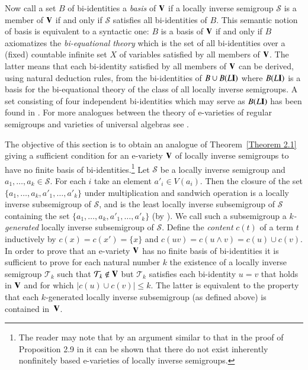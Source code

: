 \documentclass[preprint,1p,times]{elsarticle}
\numberwithin{equation}{section}
\theoremstyle{remark}
\def\pv#1{{\bf #1}}
\def\we{\wedge}
\begin{document}
Now call a set $B$ of bi-identities a \emph{basis} of $\pv V$ if
 a locally inverse semigroup $\mathcal S$ is a member
of $\pv V$ if and only if $\mathcal S$ satisfies all bi-identities of $B$. This semantic notion of basis is equivalent
to a syntactic one: $B$ is a basis of  $\pv V$ if and only if $B$ axiomatizes the \emph{bi-equational theory} which is
the set of all bi-identities over a (fixed) countable infinite set $X$ of variables satisfied by all members of $\pv
V$. The latter means that  each bi-identity satisfied by all members of $\pv V$ can be derived, using natural deduction
rules, from the bi-identities of $B\cup B(L\pv I)$ where $B(L\pv I)$ is a basis for the bi-equational theory of the
class of all locally inverse semigroups. A set consisting of four independent bi-identities which may serve as $B(L\pv
I)$ has been found in \cite{A3}. For more analogues between the theory of e-varieties of regular semigroups and
varieties of universal algebras see \cite{A2,A3,KS,Y1}.

The objective of this section is to obtain an analogue of Theorem~\ref{Theorem 2.1} giving a sufficient condition for
an e-variety $\pv V$ of locally inverse semigroups to have no finite basis of bi-identities.\footnote{The reader may
note that by an argument similar to that in the proof of Proposition 2.9 in \cite{adv} it can be shown that there do
not exist inherently nonfinitely based e-varieties of locally inverse semigroups.} Let $\mathcal S$ be a locally
inverse semigroup and $a_1,\dots,a_k\in \mathcal S$. For each $i$ take an element $a'_i\in V(a_i)$. Then the closure of
the set $\{a_1,\dots,a_k,a'_1,\dots,a'_k\}$ under multiplication and sandwich operation  is a locally inverse
subsemigroup of $\mathcal S$, and is the least locally inverse subsemigroup of $\mathcal S$ containing the set
$\{a_1,\dots,a_k,a'_1,\dots,a'_k\}$ (by \cite{Y1}). We call such a subsemigroup a {\it $k$-generated} locally inverse
subsemigroup of $\mathcal S$. Define the {\it content} $c(t)$ of a term $t$ inductively by $c(x)=c(x')=\{x\}$ and
$c(uv)=c(u\we v)=c(u)\cup c(v)$. In order to prove that an e-variety $\pv V$ has no  finite basis of bi-identities it
is sufficient to prove for each natural number $k$ the existence of a locally inverse semigroup $\mathcal{T}_k$ such
that $\mathcal{T}_k\not\in \pv V$ but $\mathcal{T}_k$ satisfies each bi-identity $u=v$ that holds in $\pv V$ and for
which $\vert c(u)\cup c(v)\vert \le k$. The latter is equivalent to the property that each $k$-generated locally
inverse subsemigroup (as defined above) is contained in~$\pv V$.
\end{document}
